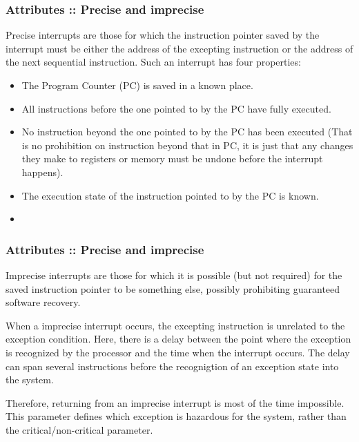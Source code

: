 \begin{frame}
  \frametitle{Attributes :: Precise and imprecise}

Precise interrupts are those for which the instruction pointer saved by the interrupt must be either the address of the excepting instruction or the address of the next sequential instruction. Such an interrupt has four properties:

  \begin{itemize}
    \item
     The Program Counter (PC) is saved in a known place.
    \item
     All instructions before the one pointed to by the PC have fully executed.
    \item
     No instruction beyond the one pointed to by the PC has been executed (That is no prohibition on instruction beyond that in PC, it is just that any changes they make to registers or memory must be undone before the interrupt happens).
    \item
     The execution state of the instruction pointed to by the PC is known.
    \item
      \etc{}
  \end{itemize}

\end{frame}


\begin{frame}
  \frametitle{Attributes :: Precise and imprecise}

Imprecise interrupts are those for which it is possible (but not required) for the saved instruction pointer to be something else, possibly prohibiting guaranteed software recovery.

\-

When a imprecise interrupt occurs, the excepting instruction is unrelated to the exception condition. Here, there is a delay between the point where the exception is recognized by the processor and the time when the interrupt occurs. The delay can span several instructions before the recognigtion of an exception state into the system.

\-

 Therefore, returning from an imprecise interrupt is most of the time impossible. This parameter defines which exception is hazardous for the system, rather than the critical/non-critical parameter.

\end{frame}



